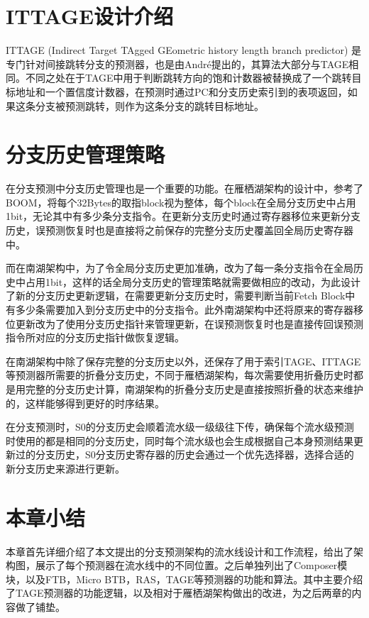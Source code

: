 
\section{ITTAGE设计介绍}

ITTAGE (Indirect Target TAgged GEometric history length branch predictor)\cite{tage, ittage} 是专门针对间接跳转分支的预测器，也是由André提出的，其算法大部分与TAGE相同。不同之处在于TAGE中用于判断跳转方向的饱和计数器被替换成了一个跳转目标地址和一个置信度计数器，在预测时通过PC和分支历史索引到的表项返回，如果这条分支被预测跳转，则作为这条分支的跳转目标地址。

\section{分支历史管理策略}

在分支预测中分支历史管理也是一个重要的功能。在雁栖湖架构的设计中，参考了BOOM，将每个32Bytes的取指block视为整体，每个block在全局分支历史中占用1bit，无论其中有多少条分支指令。在更新分支历史时通过寄存器移位来更新分支历史，误预测恢复时也是直接将之前保存的完整分支历史覆盖回全局历史寄存器中。

而在南湖架构中，为了令全局分支历史更加准确，改为了每一条分支指令在全局历史中占用1bit，这样的话全局分支历史的管理策略就需要做相应的改动，为此设计了新的分支历史更新逻辑，在需要更新分支历史时，需要判断当前Fetch Block中有多少条需要加入到分支历史中的分支指令。此外南湖架构中还将原来的寄存器移位更新改为了使用分支历史指针来管理更新，在误预测恢复时也是直接传回误预测指令所对应的分支历史指针做恢复逻辑。

在南湖架构中除了保存完整的分支历史以外，还保存了用于索引TAGE、ITTAGE等预测器所需要的折叠分支历史，不同于雁栖湖架构，每次需要使用折叠历史时都是用完整的分支历史计算，南湖架构的折叠分支历史是直接按照折叠的状态来维护的，这样能够得到更好的时序结果。

在分支预测时，S0的分支历史会顺着流水级一级级往下传，确保每个流水级预测时使用的都是相同的分支历史，同时每个流水级也会生成根据自己本身预测结果更新过的分支历史，S0分支历史寄存器的历史会通过一个优先选择器，选择合适的新分支历史来源进行更新。

\section{本章小结}

本章首先详细介绍了本文提出的分支预测架构的流水线设计和工作流程，给出了架构图，展示了每个预测器在流水线中的不同位置。之后单独列出了Composer模块，以及FTB，Micro BTB，RAS，TAGE等预测器的功能和算法。其中主要介绍了TAGE预测器的功能逻辑，以及相对于雁栖湖架构做出的改进，为之后两章的内容做了铺垫。